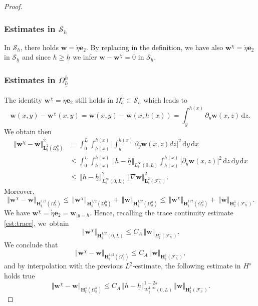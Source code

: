 \documentclass[JEP,XML,SOM,Unicode,NoFloatCountersInSection]{cedram}
\let\mathcal\mathscr
\theoremstyle{remark}
\theoremstyle{definition}
\newcommand{\norme}[1]{\,\Vert #1\Vert}
\newcommand{\dd}{\,\mathrm{d}}
\newcommand{\wg}{\boldsymbol{w}}
\newcommand{\BS}[1]{\boldsymbol{#1}}
\newcommand{\etap}{\dot{\eta}}
\newcommand{\hb}{{\underline{h}}}
\begin{document}
\begin{proof}
\subsubsection*{Estimates in $\mathcal{S}_{h}$}
In $\mathcal{S}_{h}$, there holds $\wg=\etap \BS{e}_2$. By replacing in the definition, we have also $\wg^\chi = \etap\BS{e}_2$ in $\mathcal{S}_{\hb}$ and since $h\geq \hb$ we infer $\wg - \wg^{\chi} = 0$ in $\mathcal{S}_{h}$.

\subsubsection*{Estimates in $\Omega^{h}_{\hb}$}
The identity $\wg^\chi=\etap\BS{e}_{2}$ still holds in $\Omega^{h}_{\hb} \subset \mathcal S_{\hb}$ which leads to
\[\wg(x,y)- \wg^{\chi}(x,y) = \wg(x,y) - \wg(x,h(x)) =\int_{y}^{h(x)}\partial_y\wg(x,z)\dd z.\]
We obtain then
\[
\begin{aligned}
\norme{\wg^\chi - \wg}_{\BS{L}^{2}_{\sharp}(\Omega_{\hb}^{h})}^{2}&{}=\int_{0}^{L}\int_{\hb(x)}^{h(x)}\biggl\vert \int_{y}^{h(x)}\partial_y\wg(x,z)dz\biggl\vert^{2}\dd y\dd x\\
&\leq \int_{0}^{L}\int_{\hb(x)}^{h(x)}\norme{h-\hb}_{L^{\infty}_{\sharp}(0,L)}\int_{\hb(x)}^{h(x)}\vert\partial_y\wg(x,z)\vert^{2}\dd z\dd y\dd x\\
&\leq \norme{h-\hb}_{L^{\infty}_{\sharp}(0,L)}^{2}\norme{\nabla\wg}_{\BS{L}^{2}_{\sharp}(\mathcal{F}^{-}_{h})}^{2}.
\end{aligned}
\]
Moreover,
\[\norme{\wg^\chi-\wg}_{\BS{H}^{1/2}_{\sharp}(\Omega_{\hb}^{h})}\leq \norme{\wg^\chi}_{\BS{H}^{1/2}_{\sharp}(\Omega_{\hb}^{h})} + \norme{\wg}_{\BS{H}^{1/2}_{\sharp}(\Omega_{\hb}^{h})}\leq \norme{\wg^\chi}_{\BS{H}^{1/2}_{\sharp}(\Omega_{\hb}^{h})} + \norme{\wg}_{\BS{H}^{1}_{\sharp}(\mathcal{F}^{-}_{h})}.
\]
We have
$\wg^\chi=\etap\BS{e}_2=\wg_{|{y=h}}$. Hence,
recalling the trace continuity estimate \eqref{est:trace}, we~obtain
\[
\norme{\wg^\chi}_{\BS{H}^{1/2}_{\sharp}(0,L)} \leq C_A\norme{\wg}_{H^{1}_{\sharp}(\mathcal{F}^{-}_{h})}.
\]
We conclude that
\[\norme{\wg^\chi-\wg}_{\BS{H}^{1/2}_{\sharp}(\Omega_{\hb}^{h})}\leq C_A\norme{\wg}_{\BS{H}^{1}_{\sharp}(\mathcal{F}^{-}_{h})},\]
and by interpolation with the previous $L^2$-estimate, the following estimate in $H^s$ holds true
\begin{equation} \label{eq_enhaut}
\norme{\wg^\chi-\wg}_{\BS{H}^{s}_{\sharp}(\Omega^{h}_{\hb})}\leq C_A\norme{h-\hb}_{W^{1,\infty}_{\sharp}(0,L)}^{1-2s}\norme{\wg}_{\BS{H}^{1}_{\sharp}(\mathcal{F}^{-}_{h})}.
\end{equation}


\end{proof}
\end{document}

